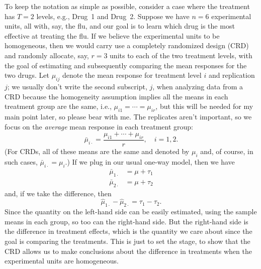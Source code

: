 \documentclass[a4paper, 12pt]{article}
\theoremstyle{plain}
\theoremstyle{definition}
\theoremstyle{remark}
\begin{document}
To keep the notation as simple as possible, consider a case where the treatment has $T=2$ levels, e.g., Drug~1 and Drug~2.  Suppose we have $n=6$ experimental units, all with, say, the flu, and our goal is to learn which drug is the most effective at treating the flu.  If we believe the experimental units to be homogeneous, then we would carry use a completely randomized design (CRD) and randomly allocate, say, $r=3$ units to each of the two treatment levels, with the goal of estimating and subsequently comparing the mean responses for the two drugs.  Let $\mu_{ij}$ denote the mean response for treatment level $i$ and replication $j$; we usually don't write the second subscript, $j$, when analyzing data from a CRD because the  homogeneity assumption implies all the means in each treatment group are the same, i.e., $\mu_{i1}=\cdots=\mu_{ir}$, but this will be needed for my main point later, so please bear with me.  The replicates aren't important, so we focus on the {\em average} mean response in each treatment group:
\[ \bar\mu_{i\cdot} = \frac{\mu_{i1} + \cdots + \mu_{ir}}{r}, \quad i=1,2. \]
(For CRDs, all of these means are the same and denoted by $\mu_i$ and, of course, in such cases, $\bar \mu_{i\cdot} = \mu_i$.)  If we plug in our usual one-way model, then we have 
\begin{align*}
\bar\mu_{1\cdot} & = \mu + \tau_1 \\
\bar\mu_{2\cdot} & = \mu + \tau_2
\end{align*}
and, if we take the difference, then 
\[ \hat\mu_{1\cdot} - \hat\mu_{2\cdot} = \tau_1 - \tau_2. \]
Since the quantity on the left-hand side can be easily estimated, using the sample means in each group, so too can the right-hand side.  But the right-hand side is the difference in treatment effects, which is the quantity we care about since the goal is comparing the treatments.  This is just to set the stage, to show that the CRD allows us to make conclusions about the difference in treatments when the experimental units are homogeneous.  
\end{document}
